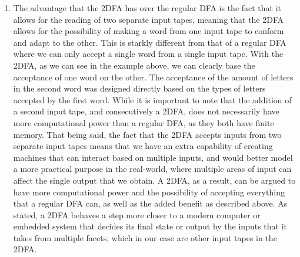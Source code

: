 \documentclass[11pt,fleqn]{article}
\begin{document}
\begin{enumerate}
        \item The advantage that the 2DFA has over the regular DFA is the fact that it allows for the reading of two separate input tapes, meaning that the 2DFA allows for the possibility of making a word from one input tape to conform and adapt to the other. This is starkly different from that of a regular DFA where we can only accept a single word from a single input tape. With the 2DFA, as we can see in the example above, we can clearly base the acceptance of one word on the other. The acceptance of the amount of letters in the second word was designed directly based on the types of letters accepted by the first word. While it is important to note that the addition of a second input tape, and consecutively a 2DFA, does not necessarily have more computational power than a regular DFA, as they both have finite memory. That being said, the fact that the 2DFA accepts inputs from two separate input tapes means that we have an extra capability of creating machines that can interact based on multiple inputs, and would better model a more practical purpose in the real-world, where multiple areas of input can affect the single output that we obtain. A 2DFA, as a result, can be argued to have more computational power and the possibility of accepting everything that a regular DFA can, as well as the added benefit as described above. As stated, a 2DFA behaves a step more closer to a modern computer or embedded system that decides its final state or output by the inputs that it takes from multiple facets, which in our case are other input tapes in the 2DFA.
    \end{enumerate}
\end{document}
